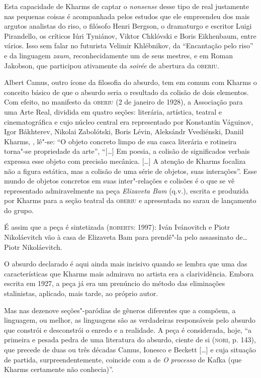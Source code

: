 Esta capacidade de Kharms de captar o \emph{nonsense} desse tipo de real
justamente nas pequenas coisas é acompanhada pelos estudos que ele
empreendeu dos mais argutos analistas do riso, o filósofo Henri Bergson,
o dramaturgo e escritor Luigi Pirandello, os críticos Iúri Tyniánov,
Viktor Chklóvski e Boris Eikhenbaum, entre vários. Isso sem falar no
futurista Velimir Khlébnikov, da ``Encantação pelo riso'' e da linguagem
\emph{zaum}, reconhecidamente um de seus mestres, e em Roman Jakobson,
que participou ativamente da \emph{soirée} de abertura da
\textsc{oberiu}.

Albert Camus, outro ícone da filosofia do absurdo, tem em comum com
Kharms o conceito básico de que o absurdo seria o resultado da colisão
de dois elementos. Com efeito, no manifesto da \textsc{oberiu} (2 de
janeiro de 1928), a Associação para uma Arte Real, dividida em quatro
seções: literária, artística, teatral e cinematográfica e cujo núcleo
central era representado por Konstantin Váguinov, Igor Bákhterev,
Nikolai Zabolótski, Boris Lévin, Aleksándr Vvediénski, Daniil Kharms, ,
lê"-se: ``O objeto concreto limpo de sua casca literária e rotineira
torna"-se propriedade da arte'', ``{[}\ldots{}{]} Em poesia, a colisão de
significados verbais expressa esse objeto com precisão mecânica.
{[}\ldots{}{]} A atenção de Kharms focaliza não a figura estática, mas a
colisão de uma série de objetos, suas interações''. Esse mundo de
objetos concretos em suas inter"-relações e colisões é o que se vê
representado admiravelmente na peça \emph{Elizaveta Bam} (q.v.), escrita
e produzida por Kharms para a seção teatral da \textsc{oberiu} e
apresentada no sarau de lançamento do grupo.

É assim que a peça é sintetizada (\textsc{roberts}: 1997): Iván
Ivánovitch e Piotr Nikoláevitch vão à casa de Elizaveta Bam para
prendê"-la pelo assassinato de\ldots{} Piotr Nikoláevitch.

O absurdo declarado é aqui ainda mais incisivo quando se lembra que uma
das características que Kharms mais admirava no artista era a
clarividência. Embora escrita em 1927, a peça já era um prenúncio do
método das eliminações stalinistas, aplicado, mais tarde, ao próprio
autor.

Mas nas dezenove seções"-paródias de gêneros diferentes que a compõem, a
linguagem, ou melhor, as linguagens são as verdadeiras responsáveis pelo
absurdo que constrói e desconstrói o enredo e a realidade. A peça é
considerada, hoje, ``a primeira e pesada pedra de uma literatura do
absurdo, ciente de si (\textsc{nori}, p. 143), que precede de duas ou
três décadas Camus, Ionesco e Beckett {[}\ldots{}{]} e cuja situação de
partida, surpreendentemente, coincide com a de \emph{O} \emph{processo}
de Kafka (que Kharms certamente não conhecia)''.

